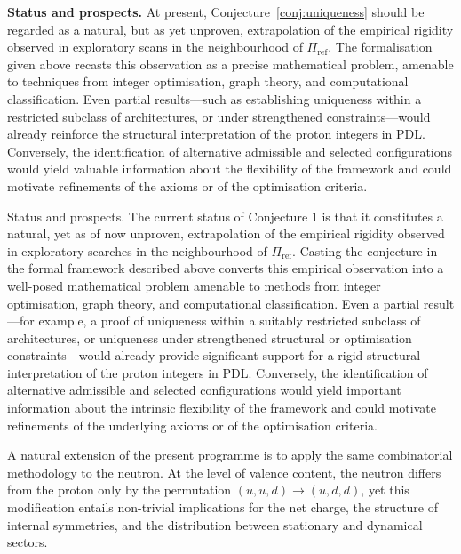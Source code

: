 \documentclass[11pt,a4paper]{article}
\begin{document}
\medskip
\noindent\textbf{Status and prospects.} At present, Conjecture~\ref{conj:uniqueness} should be regarded as a natural, but as yet unproven, extrapolation of the empirical rigidity observed in exploratory scans in the neighbourhood of $\Pi_{\mathrm{ref}}$.\cite{LaubscherPDLFull2026,LaubscherIMRadPDL2026} The formalisation given above recasts this observation as a precise mathematical problem, amenable to techniques from integer optimisation, graph theory, and computational classification. Even partial results—such as establishing uniqueness within a restricted subclass of architectures, or under strengthened constraints—would already reinforce the structural interpretation of the proton integers in PDL. Conversely, the identification of alternative admissible and selected configurations would yield valuable information about the flexibility of the framework and could motivate refinements of the axioms or of the optimisation criteria.

Status and prospects. The current status of Conjecture 1 is that it constitutes a natural, yet as of now unproven, extrapolation of the empirical rigidity observed in exploratory searches in the neighbourhood of $\Pi_{\mathrm{ref}}$.\cite{LaubscherPDLFull2026,LaubscherIMRadPDL2026} Casting the conjecture in the formal framework described above converts this empirical observation into a well-posed mathematical problem amenable to methods from integer optimisation, graph theory, and computational classification. Even a partial result—for example, a proof of uniqueness within a suitably restricted subclass of architectures, or uniqueness under strengthened structural or optimisation constraints—would already provide significant support for a rigid structural interpretation of the proton integers in PDL. Conversely, the identification of alternative admissible and selected configurations would yield important information about the intrinsic flexibility of the framework and could motivate refinements of the underlying axioms or of the optimisation criteria.

A natural extension of the present programme is to apply the same combinatorial methodology to the neutron. At the level of valence content, the neutron differs from the proton only by the permutation $(u,u,d)\to(u,d,d)$, yet this modification entails non-trivial implications for the net charge, the structure of internal symmetries, and the distribution between stationary and dynamical sectors.\cite{LaubscherPDLFull2026,LaubscherLDP2026} 
\end{document}
